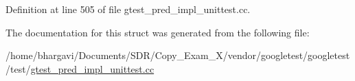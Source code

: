 Definition at line 505 of file gtest\+\_\+pred\+\_\+impl\+\_\+unittest.\+cc.



The documentation for this struct was generated from the following file\+:\begin{DoxyCompactItemize}
\item 
/home/bhargavi/\+Documents/\+S\+D\+R/\+Copy\+\_\+\+Exam\+\_\+X/vendor/googletest/googletest/test/\hyperlink{gtest__pred__impl__unittest_8cc}{gtest\+\_\+pred\+\_\+impl\+\_\+unittest.\+cc}\end{DoxyCompactItemize}
